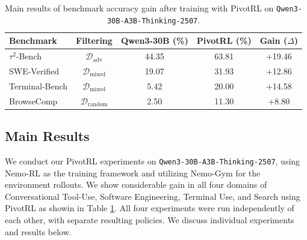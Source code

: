 \begin{table}[!t]
\centering
\small %
\begin{tabular}{lcccc}
\toprule
\textbf{Benchmark} & Filtering & \textbf{Qwen3-30B (\%)} & \textbf{PivotRL (\%)} & \textbf{Gain ($\Delta$)} \\ 
\midrule
$\tau^2$-Bench             & $\mathcal{D}_{\text{adv}}$    & 44.35 & 63.81 & +19.46 \\
SWE-Verified               & $\mathcal{D}_{\text{mixed}}$  & 19.07 & 31.93 & +12.86 \\
Terminal-Bench             & $\mathcal{D}_{\text{mixed}}$  & 5.42  & 20.00 & +14.58 \\ 
BrowseComp                 & $\mathcal{D}_{\text{random}}$ & 2.50  & 11.30 & +8.80  \\
\bottomrule
\end{tabular}
\caption{Main results of benchmark accuracy gain after training with PivotRL on \texttt{Qwen3-30B-A3B-Thinking-2507}.}
\label{tab:main_results_enhanced}
\end{table}

\subsection{Main Results}
We conduct our PivotRL experiments on \texttt{Qwen3-30B-A3B-Thinking-2507}, using Nemo-RL \citep{nemo-rl} as the training framework and utilizing Nemo-Gym \citep{nemo-gym} for the environment rollouts. We show considerable gain in all four domains of Conversational Tool-Use, Software Engineering, Terminal Use, and Search using PivotRL as showin in Table \ref{tab:main_results_enhanced}. All four experiments were run independently of each other, with separate resulting policies. We discuss individual experiments and results below.

